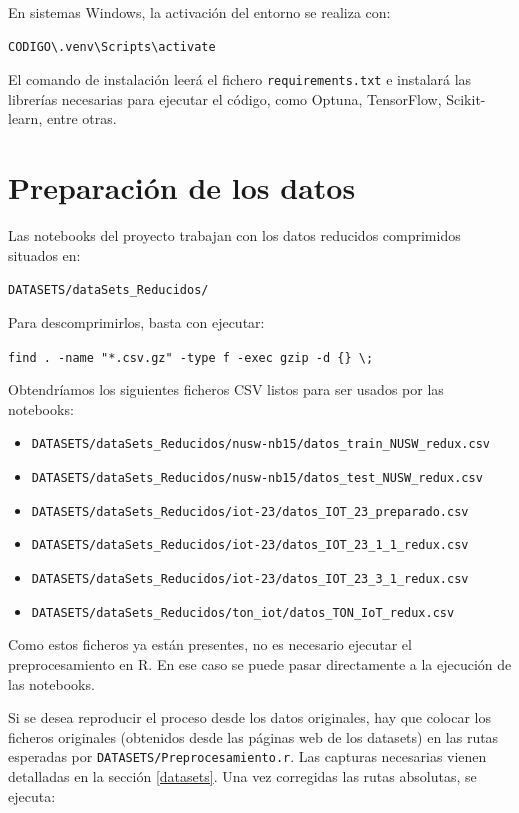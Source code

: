 En sistemas Windows, la activación del entorno se realiza con:

\begin{verbatim}
CODIGO\.venv\Scripts\activate
\end{verbatim}

El comando de instalación leerá el fichero \texttt{requirements.txt} e instalará las librerías necesarias para ejecutar el código, como Optuna, TensorFlow, Scikit-learn, entre otras.

\section{Preparación de los datos}

Las notebooks del proyecto trabajan con los datos reducidos comprimidos situados en:

\texttt{DATASETS/dataSets\_Reducidos/}

Para descomprimirlos, basta con ejecutar:

\texttt{find . -name "*.csv.gz" -type f -exec gzip -d \{\} \textbackslash;}

Obtendríamos los siguientes ficheros CSV listos para ser usados por las notebooks:

\begin{itemize}
    \item \texttt{DATASETS/dataSets\_Reducidos/nusw-nb15/datos\_train\_NUSW\_redux.csv}
    \item \texttt{DATASETS/dataSets\_Reducidos/nusw-nb15/datos\_test\_NUSW\_redux.csv}
    \item \texttt{DATASETS/dataSets\_Reducidos/iot-23/datos\_IOT\_23\_preparado.csv}
    \item \texttt{DATASETS/dataSets\_Reducidos/iot-23/datos\_IOT\_23\_1\_1\_redux.csv}
    \item \texttt{DATASETS/dataSets\_Reducidos/iot-23/datos\_IOT\_23\_3\_1\_redux.csv}
    \item \texttt{DATASETS/dataSets\_Reducidos/ton\_iot/datos\_TON\_IoT\_redux.csv}
\end{itemize}

Como estos ficheros ya están presentes, no es necesario ejecutar el preprocesamiento en R. En ese caso se puede pasar directamente a la ejecución de las notebooks.

Si se desea reproducir el proceso desde los datos originales, hay que colocar los ficheros originales (obtenidos desde las páginas web de los datasets) en las rutas esperadas por \texttt{DATASETS/Preprocesamiento.r}. 
Las capturas necesarias vienen detalladas en la sección \ref{datasets}. Una vez corregidas las rutas absolutas, se ejecuta:

